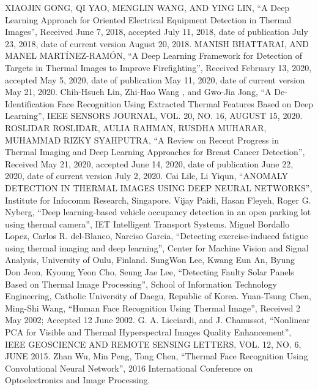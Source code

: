 \documentclass[11pt,twocolumn,letterpaper]{article}
\begin{document}
\begin{CJK*}{UTF8}{bsmi}
\begin{thebibliography}{99}  
XIAOJIN GONG, QI YAO, MENGLIN WANG, AND YING LIN, “A Deep Learning Approach for Oriented Electrical Equipment Detection in Thermal Images”, Received June 7, 2018, accepted July 11, 2018, date of publication July 23, 2018, date of current version August 20, 2018.  
MANISH BHATTARAI, AND MANEL MARTÍNEZ-RAMÓN, “A Deep Learning Framework for Detection of Targets in Thermal Images to Improve Firefighting”, Received February 13, 2020, accepted May 5, 2020, date of publication May 11, 2020, date of current version May 21, 2020.  
Chih-Hsueh Lin, Zhi-Hao Wang , and Gwo-Jia Jong, “A De-Identification Face Recognition Using
Extracted Thermal Features Based on Deep Learning”, IEEE SENSORS JOURNAL, VOL. 20, NO. 16, AUGUST 15, 2020.
ROSLIDAR ROSLIDAR, AULIA RAHMAN, RUSDHA MUHARAR, MUHAMMAD RIZKY SYAHPUTRA, “A Review on Recent Progress in Thermal Imaging and Deep Learning Approaches for Breast Cancer Detection”, Received May 21, 2020, accepted June 14, 2020, date of publication June 22, 2020, date of current version July 2, 2020.
Cai Lile, Li Yiqun, “ANOMALY DETECTION IN THERMAL IMAGES USING DEEP NEURAL NETWORKS”, Institute for Infocomm Research, Singapore.  
Vijay Paidi, Hasan Fleyeh, Roger G. Nyberg, “Deep learning-based vehicle occupancy detection in an open parking lot using thermal camera”, IET Intelligent Transport Systems.  
Miguel Bordallo Lopez, Carlos R. del-Blanco, Narciso Garcia, “Detecting exercise-induced fatigue using thermal imaging and deep learning”, Center for Machine Vision and Signal Analysis, University of Oulu, Finland.  
SungWon Lee, Kwang Eun An, Byung Don Jeon, Kyoung Yeon Cho, Seung Jae Lee, “Detecting Faulty Solar Panels Based on Thermal Image Processing”, School of Information Technology Engineering, Catholic University of Daegu, Republic of Korea.  
Yuan-Tsung Chen, Ming-Shi Wang, “Human Face Recognition Using Thermal Image”, Received 2 May 2002; Accepted 12 June 2002.
G. A. Licciardi, and J. Chanussot, “Nonlinear PCA for Visible and Thermal Hyperspectral Images Quality Enhancement”, IEEE GEOSCIENCE AND REMOTE SENSING LETTERS, VOL. 12, NO. 6, JUNE 2015. 
Zhan Wu, Min Peng, Tong Chen, “Thermal Face Recognition Using Convolutional Neural Network”, 2016 International Conference on Optoelectronics and Image Processing. 
\end{thebibliography}

\end{CJK*}
\end{document}
